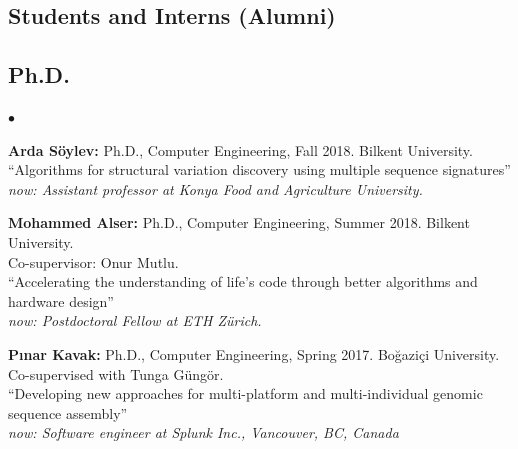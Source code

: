 \documentclass[margin,line]{res}
\newenvironment{list2}{
  \begin{list}{$\bullet$}{%
      \setlength{\itemsep}{0.1cm}
      \setlength{\parsep}{0in} \setlength{\parskip}{0in}
      \setlength{\topsep}{0in} \setlength{\partopsep}{0in} 
      \setlength{\leftmargin}{0.2in}}}{\end{list}}
\begin{document}
\begin{resume}
\clearpage

\section{\sc Students and Interns (Alumni)}
\vspace*{-.4cm}
\subsection{\small \sc Ph.D.}
\begin{list2}
\item
  {\bf Arda Söylev:} Ph.D., Computer Engineering, Fall 2018.
  Bilkent University. \\
  ``Algorithms for structural variation discovery using multiple sequence signatures''\\
    {\it now: Assistant professor at Konya Food and Agriculture University.}
\item
  {\bf Mohammed Alser:} Ph.D., Computer Engineering, Summer 2018.
  Bilkent University.\\ Co-supervisor: Onur Mutlu.\\
  ``Accelerating the understanding of life’s code through better algorithms and hardware design''\\
  {\it now: Postdoctoral Fellow at ETH Zürich.}
\item
  {\bf P{\i}nar Kavak:} Ph.D., Computer Engineering, Spring 2017.
  Bo\u{g}azi\c{c}i University. Co-supervised with Tunga G\"{u}ng\"{o}r.\\
  ``Developing new approaches for multi-platform and multi-individual genomic sequence assembly''\\
  {\it now: Software engineer at Splunk Inc., Vancouver, BC, Canada}
\end{list2}

\vspace*{-.4cm}

\end{resume}
\end{document}
